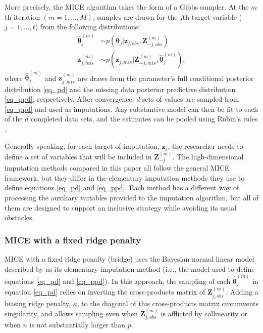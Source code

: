 More precisely, the MICE algorithm takes the form of a Gibbs sampler. At the $m$th iteration $(m = 1, ..., M)$, samples are drawn for the $j$th target variable ($j = 1, ..., t$) from the following distributions:
%
	\begin{align}
	\hat{\bm{\theta}}_{j}^{(m)} &\sim 
		p(\bm{\theta}_j | \bm{z}_{j, obs}, \bm{Z}_{-j, obs}^{(m)}) 
		\label{eq_pd}\\
	\bm{z}_{j, mis}^{(m)} &\sim 
		p(\bm{z}_{j, mis} | \bm{Z}_{-j, mis}^{(m)}, \hat{\bm{\theta}}_{j}^{(m)}) 
		\label{eq_ppd},
	\end{align}
%
where $\hat{\bm{\theta}}_{j}^{(m)}$ and $\bm{z}_{j, mis}^{(m)}$ are draws from the parameter's full conditional posterior 
distribution \eqref{eq_pd} and the missing data posterior predictive distribution \eqref{eq_ppd}, respectively.
After convergence, $d$ sets of values are sampled from \eqref{eq_ppd} and used as imputations.
Any substantive model can then be fit to each of the $d$ completed data sets, and the estimates can be pooled using Rubin's rules
\citep{rubin:1987}.

Generally speaking, for each target of imputation, $\bm{z}_j$, the researcher needs to define a set of variables that will be included in $\bm{Z}_{-j}^{(m)}$.
The high-dimensional imputation methods compared in this paper all follow the general MICE framework,
but they differ in the elementary imputation methods they use to define equations \eqref{eq_pd} and \eqref{eq_ppd}.
Each method has a different way of processing the auxiliary variables provided to the 
imputation algorithm, but all of them are designed to support an inclusive strategy while avoiding its usual obstacles.

\subsubsection{MICE with a fixed ridge penalty}
	MICE with a fixed ridge penalty (bridge) uses the Bayesian normal linear model described by \citet[][p. 68, algorithm 3.1]{vanBuuren:2018} as its elementary imputation method (i.e., the model used to define equations \eqref{eq_pd} and \eqref{eq_ppd}).
	In this approach, the sampling of each $\hat{\bm{\theta}}_{j}^{(m)}$ in equation \eqref{eq_pd} relies on inverting the cross-products matrix of $\bm{Z}_{j, obs}^{(m)}$.
	Adding a biasing ridge penalty, $\kappa$, to the diagonal of this cross-products matrix circumvents singularity, and allows
	sampling even when $\bm{Z}_{j, obs}^{(m)}$ is afflicted by collinearity or when $n$ is not 
	substantially larger than $p$.

